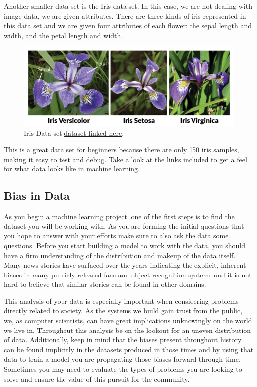 \documentclass{article}
\begin{document}
\newpage

Another smaller data set is the Iris data set. In this case, we are not dealing with image data, we are given attributes. There are three kinds of iris represented in this data set and we are given four attributes of each flower: the sepal length and width, and the petal length and width.  

\begin{figure}[H]
    \centering
    \includegraphics[width=4.5in]{iris.png}
    \caption{Iris Data set \href{https://archive.ics.uci.edu/ml/datasets/iris}{dataset linked here}.}
\end{figure}

This is a great data set for beginners because there are only 150 iris samples, making it easy to test and debug. Take a look at the links included to get a feel for what data looks like in machine learning.

\subsection{Bias in Data}
As you begin a machine learning project, one of the first steps is to find the dataset you will be working with. As you are forming the initial questions that you hope to answer with your efforts make sure to also ask the data some questions. Before you start building a model to work with the data, you should have a firm understanding of the distribution and makeup of the data itself. Many news stories have surfaced over the years indicating the explicit, inherent biases in many publicly released face and object recognition systems and it is not hard to believe that similar stories can be found in other domains. 

This analysis of your data is especially important when considering problems directly related to society. As the systems we build gain trust from the public, we, as computer scientists, can have great implications unknowingly on the world we live in. Throughout this analysis be on the lookout for an uneven distribution of data. Additionally, keep in mind that the biases present throughout history can be found implicitly in the datasets produced in those times and by using that data to train a model you are propagating those biases forward through time. Sometimes you may need to evaluate the types of problems you are looking to solve and ensure the value of this pursuit for the community.
\end{document}
